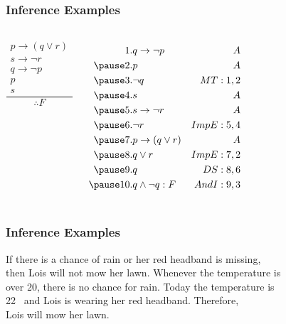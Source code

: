 \documentclass[dvipsnames]{beamer}
\begin{document}
\begin{frame}
  \frametitle{Inference Examples}

  \begin{example}
    \begin{columns}
      \[
      \frac
        {
          \begin{array}{c}
            p \rightarrow (q \vee r)\\
            s \rightarrow \neg r\\
            q \rightarrow \neg p\\
            p\\
            s
          \end{array}
        }
        {
          \therefore F
        }
      \]

      \pause
      \begin{eqnarray*}
        1. & q \rightarrow \neg p     & A\\
       \pause
        2. & p                        & A\\
       \pause
        3. & \neg q                   & MT:1,2\\
       \pause
        4. & s                        & A\\
       \pause
        5. & s \rightarrow \neg r     & A\\
       \pause
        6. & \neg r                   & ImpE:5,4\\
       \pause
        7. & p \rightarrow (q \vee r) & A\\
       \pause
        8. & q \vee r                 & ImpE:7,2\\
       \pause
        9. & q                        & DS:8,6\\
       \pause
       10. & q \wedge \neg q : F      & AndI:9,3
      \end{eqnarray*}
    \end{columns}
  \end{example}
\end{frame}

\begin{frame}
  \frametitle{Inference Examples}

  \begin{example}
    If there is a chance of rain or her red headband is missing,\\
    then Lois will not mow her lawn. Whenever the temperature is\\
    over 20\textcelsius, there is no chance for rain. Today the temperature is\\
    22\textcelsius ~ and Lois is wearing her red headband. Therefore,\\
    Lois will mow her lawn.
  \end{example}
\end{frame}
\end{document}
